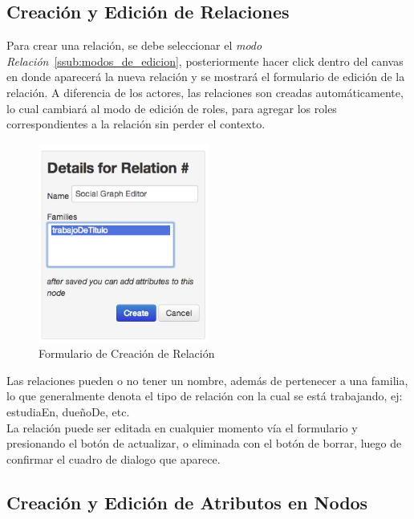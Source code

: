 \subsection{Creación y Edición de Relaciones} %
\label{sub:creacion_y_edicion_de_relaciones}

Para crear una relación, se debe seleccionar el \emph{modo Relación}~\ref{ssub:modos_de_edicion}, posteriormente hacer click dentro del canvas en donde aparecerá la nueva relación y se mostrará el formulario de edición de la relación. A diferencia de los actores, las relaciones son creadas automáticamente, lo cual cambiará al modo de edición de roles, para agregar los roles correspondientes a la relación sin perder el contexto.

\begin{figure}[H]
  \centering
  \includegraphics[width=0.5\textwidth]{images/creacion_relacion.png}
  \caption{Formulario de Creación de Relación}
  \label{creacion_relacion}
\end{figure}

Las relaciones pueden o no tener un nombre, además de pertenecer a una familia, lo que generalmente denota el tipo de relación con la cual se está trabajando, ej: estudiaEn, dueñoDe, etc.\\

La relación puede ser editada en cualquier momento vía el formulario y presionando el botón de actualizar, o eliminada con el botón de borrar, luego de confirmar el cuadro de dialogo que aparece.


\subsection{Creación y Edición de Atributos en Nodos} %
\label{sub:creacion_y_edicion_de_atributos_en_nodos}


